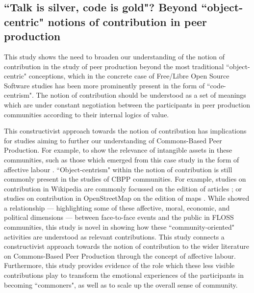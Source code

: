 \subsection{``Talk is silver, code is gold"? Beyond ``object-centric" notions of contribution in peer production}

This study shows the need to broaden our understanding of the notion of contribution in the study of peer production beyond the most traditional ``object-centric" conceptions, which in the concrete case of Free/Libre Open Source Software studies has been more prominently present in the form of ``code-centrism". The notion of contribution should be understood as a set of meanings which are under constant negotiation between the participants in peer production communities according to their internal logics of value.

This constructivist approach towards the notion of contribution has implications for studies aiming to further our understanding of Commons-Based Peer Production. For example, to show the relevance of intangible assets in these communities, such as those which emerged from this case study in the form of affective labour \parencite{hardt1999affective}. ``Object-centrism" within the notion of contribution is still commonly present in the studies of CBPP communities. For example, studies on contribution in Wikipedia are commonly focussed on the edition of articles \parencite[e.g.][]{kittur2007power, 6480229, Matei2015178}; or studies on contribution in OpenStreetMap on the edition of maps \parencite[e.g.][]{doi:10.1179/000870410X12911304958827, ijgi1020146}. While \textcite{coleman2013coding} showed a relationship --- highlighting some of these affective, moral, economic, and political dimensions --- between face-to-face events and the public in FLOSS communities, this study is novel in showing how these ``community-oriented" activities are understood as relevant contributions. This study connects a constructivist approach towards the notion of contribution to the wider literature on Commons-Based Peer Production through the concept of affective labour. Furthermore, this study provides evidence of the role which these less visible contributions play to transform the emotional experiences of the participants in becoming ``commoners", as well as to scale up the overall sense of community.

